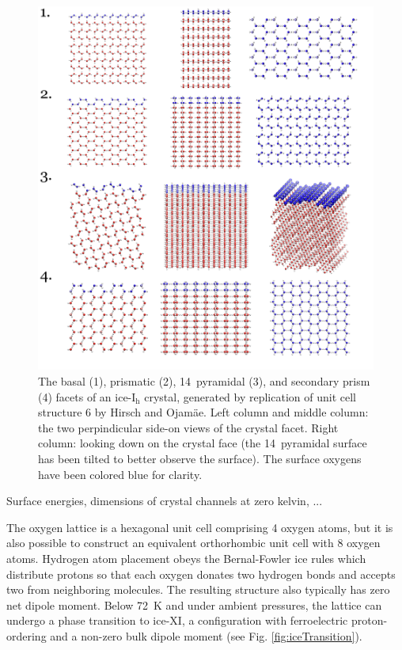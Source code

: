 \begin{figure} 
\includegraphics[width=1.0\linewidth]{Figures/surfMorph}
\caption{\label{fig:surfMorph}The basal (1), prismatic (2),
  14\degree~pyramidal (3), and secondary prism (4) facets of an
  ice-I$_\mathrm{h}$ crystal, generated by replication of unit cell
  structure 6 by Hirsch and Ojam\"{a}e. Left column and middle column:
  the two perpindicular side-on views of the crystal facet. Right
  column: looking down on the crystal face (the 14\degree~pyramidal
  surface has been tilted to better observe the surface). The surface oxygens have
  been colored blue for clarity.}
\end{figure}

Surface energies, dimensions of crystal channels at zero kelvin, ...

The oxygen lattice is a hexagonal unit cell comprising 4 oxygen atoms,
but it is also possible to construct an equivalent orthorhombic unit
cell with 8 oxygen atoms.\cite{Hirsch2004} Hydrogen atom placement
obeys the Bernal-Fowler ice rules which distribute protons so that
each oxygen donates two hydrogen bonds and accepts two from
neighboring molecules.\cite{Bernal1933} The resulting structure also
typically has zero net dipole moment. Below 72~K and under ambient
pressures, the lattice can undergo a phase transition to ice-XI, a
configuration with ferroelectric proton-ordering and a non-zero bulk
dipole moment (see Fig. \ref{fig:iceTransition}).

